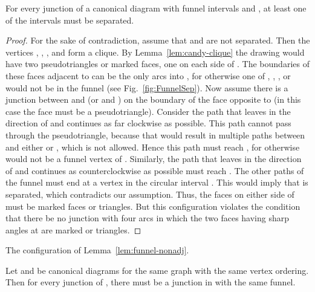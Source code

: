 \documentclass{llncs}
\begin{document}
\begin{lemma}
\label{lem:funnel-nonadj}
For every junction  of a canonical diagram with funnel intervals  and , at least one of the intervals must be separated.
\end{lemma}
\begin{proof}
For the sake of contradiction, assume that  and  are not separated. Then the vertices , , , and  form a clique. By Lemma~\ref{lem:candy-clique} the drawing
would have two pseudotriangles or marked faces, one on each side of .
The boundaries of these faces adjacent to  can be the only arcs into , for otherwise one of , , , or  would not be in the funnel (see Fig.~\ref{fig:FunnelSep}). Now assume there is a junction  between  and  (or  and ) on the boundary of the face opposite to  (in this case the face must be a pseudotriangle). Consider the path that leaves  in the direction of  and continues as far clockwise as possible. This path cannot pass through the pseudotriangle, because that would result in multiple paths between  and either  or , which is not allowed. Hence this path must reach , for otherwise  would not be a funnel vertex of . Similarly, the path that leaves  in the direction of  and continues as counterclockwise as possible must reach . The other paths of the funnel must end at a vertex in the circular interval . This would imply that  is separated, which contradicts our assumption. Thus, the faces on either side of  must be marked faces or triangles. But this configuration violates the condition that there be no junction  with four arcs in which the two faces having sharp angles at  are marked or triangles.
\end{proof}

 {The configuration of Lemma~\ref{lem:funnel-nonadj}.}

\begin{lemma}
\label{lem:candy-same-junctions}
Let  and  be canonical diagrams for the same graph  with the same vertex ordering.
Then for every junction  of , there must be a junction  in  with the same funnel.
\end{lemma}
\end{document}
